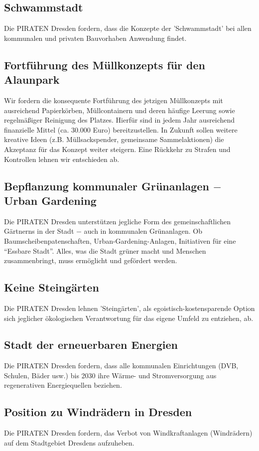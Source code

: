 \documentclass[a4paper, 11pt]{article}
\begin{document}
\subsection{Schwammstadt}
Die PIRATEN Dresden fordern, dass die Konzepte der 'Schwammstadt' bei allen kommunalen und privaten Bauvorhaben Anwendung findet.

\subsection{Fortführung des Müllkonzepts für den Alaunpark}
Wir fordern die konsequente Fortführung des jetzigen Müllkonzepts mit ausreichend Papierkörben, Müllcontainern und deren häufige Leerung sowie regelmäßiger Reinigung des Platzes. Hierfür sind in jedem Jahr ausreichend finanzielle Mittel (ca. 30.000 Euro) bereitzustellen. In Zukunft sollen weitere kreative Ideen (z.B. Müllsackspender, gemeinsame Sammelaktionen) die Akzeptanz für das Konzept weiter steigern. Eine Rückkehr zu Strafen und Kontrollen lehnen wir entschieden ab.


\subsection{Bepflanzung kommunaler Grünanlagen $-$ Urban Gardening}
Die PIRATEN Dresden unterstützen jegliche Form des gemeinschaftlichen Gärtnerns in der Stadt $-$ auch in kommunalen Grünanlagen. Ob Baumscheibenpatenschaften, Urban-Gardening-Anlagen, Initiativen für eine ``Essbare Stadt''. Alles, was die Stadt grüner macht und Menschen zusammenbringt, muss ermöglicht und gefördert werden.


\subsection{Keine Steingärten}
Die PIRATEN Dresden lehnen 'Steingärten', als egoistisch-kostensparende Option sich jeglicher ökologischen Verantwortung für das eigene Umfeld zu entziehen, ab.


\subsection{Stadt der erneuerbaren Energien}
Die PIRATEN Dresden fordern, dass alle kommunalen Einrichtungen (DVB, Schulen, Bäder usw.) bis 2030 ihre Wärme- und Stromversorgung aus regenerativen Energiequellen beziehen.


\subsection{Position zu Windrädern in Dresden}
Die PIRATEN Dresden fordern, das Verbot von Windkraftanlagen (Windrädern) auf dem Stadtgebiet Dresdens aufzuheben.
\end{document}
